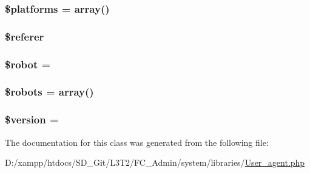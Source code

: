 \subsubsection[{\$platforms}]{\setlength{\rightskip}{0pt plus 5cm}\$platforms = array()}\label{class_c_i___user__agent_a1c1a0a860242698ee6b3f4ef7d6eb343}
\hypertarget{class_c_i___user__agent_a872d93ddbbb879ab5c0eb29261a520a4}{}
\subsubsection[{\$referer}]{\setlength{\rightskip}{0pt plus 5cm}\$referer}\label{class_c_i___user__agent_a872d93ddbbb879ab5c0eb29261a520a4}
\hypertarget{class_c_i___user__agent_aaf86508e45876d0081cadac4cb8a8808}{}
\subsubsection[{\$robot}]{\setlength{\rightskip}{0pt plus 5cm}\${\bf robot} = \textquotesingle{}\textquotesingle{}}\label{class_c_i___user__agent_aaf86508e45876d0081cadac4cb8a8808}
\hypertarget{class_c_i___user__agent_a5752e2a66d1c03bc34666492746037ab}{}
\subsubsection[{\$robots}]{\setlength{\rightskip}{0pt plus 5cm}\$robots = array()}\label{class_c_i___user__agent_a5752e2a66d1c03bc34666492746037ab}
\hypertarget{class_c_i___user__agent_a17c8948c68aa44fa9961ae169b6a8961}{}
\subsubsection[{\$version}]{\setlength{\rightskip}{0pt plus 5cm}\${\bf version} = \textquotesingle{}\textquotesingle{}}\label{class_c_i___user__agent_a17c8948c68aa44fa9961ae169b6a8961}


The documentation for this class was generated from the following file\+:\begin{DoxyCompactItemize}
\item 
D\+:/xampp/htdocs/\+S\+D\+\_\+\+Git/\+L3\+T2/\+F\+C\+\_\+\+Admin/system/libraries/\hyperlink{_user__agent_8php}{User\+\_\+agent.\+php}\end{DoxyCompactItemize}
